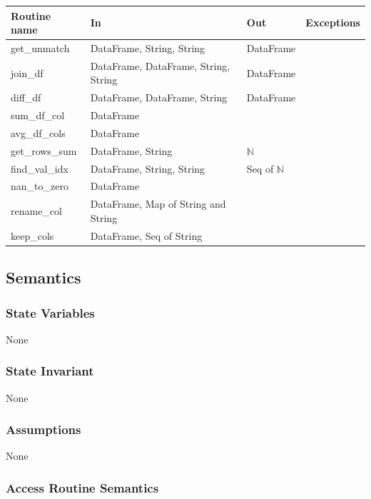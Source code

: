 \documentclass[12pt]{article}
\begin{document}
\begin{tabular}{| l | l | l | p{5cm} |}
\hline
\textbf{Routine name} & \textbf{In} & \textbf{Out} & \textbf{Exceptions}\\
\hline
get\_unmatch & DataFrame, String, String & DataFrame & \\
\hline
join\_df & DataFrame, DataFrame, String, String & DataFrame & \\
\hline
diff\_df & DataFrame, DataFrame, String & DataFrame & \\
\hline
sum\_df\_col & DataFrame & & \\
\hline
avg\_df\_cols & DataFrame &  & \\
\hline
get\_rows\_sum & DataFrame, String & $\mathbb{N}$ & \\
\hline
find\_val\_idx & DataFrame, String, String & Seq of $\mathbb{N}$ & \\
\hline
nan\_to\_zero & DataFrame&  & \\
\hline
rename\_col & DataFrame, Map of String and String &  & \\
\hline
keep\_cols & DataFrame, Seq of String &  & \\
\hline

\end{tabular}

\subsection* {Semantics}

\subsubsection* {State Variables}

None

\subsubsection* {State Invariant}

None

\subsubsection* {Assumptions}

None

\subsubsection* {Access Routine Semantics}
\end{document}
